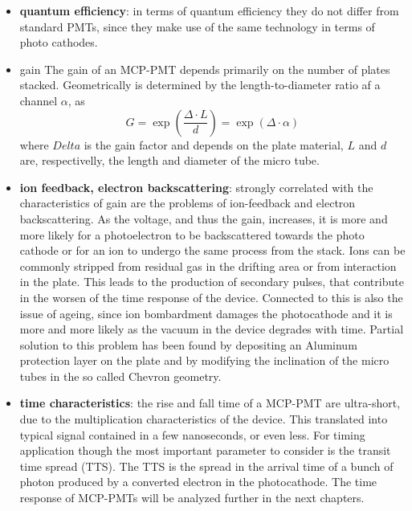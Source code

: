 \begin{itemize}
\item \textbf{quantum efficiency}: in terms of quantum efficiency they do not differ from standard PMTs, since they make use of the same technology in terms of photo cathodes.
\item gain
The gain of an MCP-PMT depends primarily on the number of plates stacked. Geometrically is determined by the length-to-diameter ratio af a channel $\alpha$, as
\begin{equation}
G = \exp{\left( \frac{\Delta \cdot L}{d} \right)} = \exp{\left( \Delta \cdot \alpha \right)}
\end{equation}
where $Delta$ is the gain factor and depends on the plate material, $L$ and $d$ are, respectivelly, the length and diameter of the micro tube.
\item \textbf{ion feedback, electron backscattering}: strongly correlated with the characteristics of gain are the problems of ion-feedback and electron backscattering. As the voltage, and thus the gain, increases, it is more and more likely for a photoelectron to be backscattered towards the photo cathode or for an ion to undergo the same process from the stack. Ions can be commonly stripped from residual gas in the drifting area or from interaction in the plate.
This leads to the production of secondary pulses, that contribute in the worsen of the time response of the device.
Connected to this is also the issue of ageing, since ion bombardment damages the photocathode and it is more and more likely as the vacuum in the device degrades with time.
Partial solution to this problem has been found by depositing an Aluminum protection layer on the plate and by modifying the inclination of the micro tubes in the so called Chevron geometry\cite{Vavra2004}.

\item \textbf{time characteristics}: the rise and fall time of a MCP-PMT are ultra-short, due to the multiplication characteristics of the device. This translated into typical signal contained in a few nanoseconds, or even less. For timing application though the most important parameter to consider is the transit time spread (TTS). The TTS is the spread in the arrival time of a bunch of photon produced by a converted electron in the photocathode. The time response of MCP-PMTs will be analyzed further in the next chapters.

\end{itemize}


